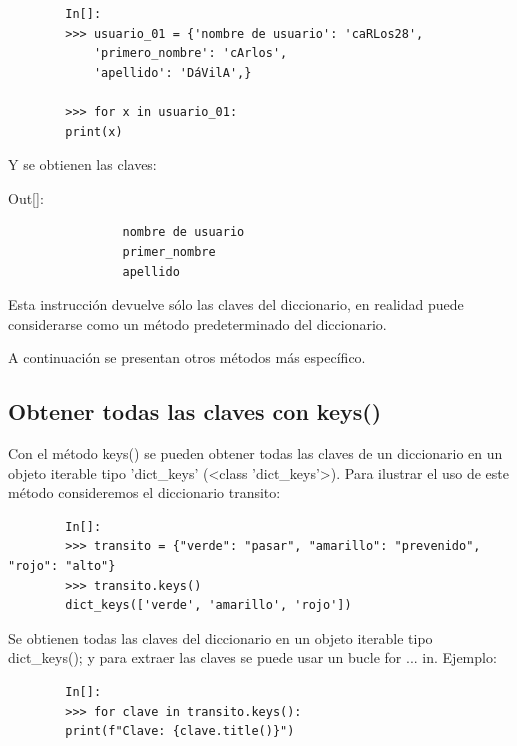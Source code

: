 	\begin{lstlisting}
		In[]:
		>>> usuario_01 = {'nombre de usuario': 'caRLos28', 
			'primero_nombre': 'cArlos',
			'apellido': 'DáVilA',}
		
		>>> for x in usuario_01:
		print(x)	          
	\end{lstlisting}
	
	Y se obtienen las claves:
	
	{\ttfamily\scriptsize\scriptsize\noindent Out[]:\vspace{-0.35cm}
		{\color{blue}			
			\begin{verbatim}
				nombre de usuario
				primer_nombre
				apellido
			\end{verbatim}
		}
	}
	
	
	
	Esta instrucción devuelve sólo las claves del diccionario, en realidad puede considerarse como un método
	predeterminado del diccionario.
	
	A continuación se presentan otros métodos más específico.
	
	
	\subsection{Obtener todas las claves con keys()}
	
	Con el método {\ttfamily  keys()}  se pueden obtener todas las claves de un diccionario en un objeto iterable tipo  {\ttfamily{}'{}dict\_keys{}'{}}   ({\ttfamily <class {}'{}dict\_keys{}'{}>{}}). Para ilustrar el uso de este método  consideremos el diccionario {\ttfamily transito}\label{transito}:
	
	\begin{lstlisting}
		In[]:	
		>>> transito = {"verde": "pasar", "amarillo": "prevenido", "rojo": "alto"}
		>>> transito.keys()
		dict_keys(['verde', 'amarillo', 'rojo'])
	\end{lstlisting} 
	
	Se obtienen  todas las claves del diccionario en un objeto iterable tipo  {\ttfamily dict\_keys()}; y para extraer las claves se puede usar un bucle {\ttfamily for ... in}. Ejemplo:
	
	\begin{lstlisting}
		In[]:
		>>> for clave in transito.keys():
		print(f"Clave: {clave.title()}")
	\end{lstlisting}
	
